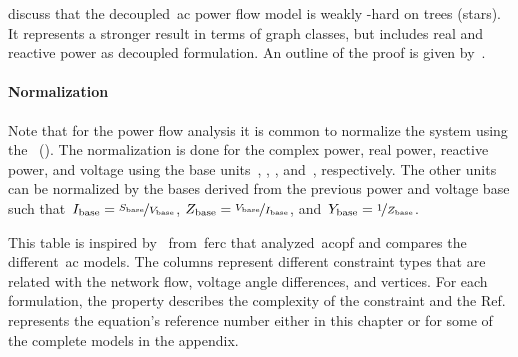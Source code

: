 \textcite{Leh16} discuss that the decoupled~\gls{ac} power flow model is weakly
\NP-hard on trees (stars). It represents a stronger result in terms of graph
classes, but includes real and reactive power as decoupled formulation. An
outline of the proof is given by~\textcite{Lav12}.
% 
\paragraph{Normalization}%
\label{ch:foundations:sec:power-flow-analyses:normalization}
% 
Note that for the power flow analysis it is common to normalize the system using
the~ (). The normalization is done for the complex power,
real power, reactive power, and voltage using the base units~\complexpowerbase,
\realpowerbase, \reactivepowerbase, and~\voltagebase, respectively. The other
units can be normalized by the bases derived from the previous power and voltage
base such that~$I_{\mathrm{base}} = \nicefrac{S_{\mathrm{base}}}{V_{\mathrm{base}}}$,
$Z_{\mathrm{base}} = \nicefrac{V_{\mathrm{base}}}{I_{\mathrm{base}}}$, and~$Y_{\mathrm{base}} =
\nicefrac{1}{Z_{\mathrm{base}}}$.
% 
\begin{landscape}
\begin{table}[t!]
    \centering
    
    \caption[Comparison of the different~\acrshort{ac} models.]{This table is
    inspired by~\textcite{Cai12} from~\gls{ferc} that analyzed~\gls{acopf} and
    compares the different~\gls{ac} models. The columns represent different
    constraint types that are related with the network flow, voltage angle
    differences, and vertices. For each formulation, the property describes the
    complexity of the constraint and the Ref. represents the equation's
    reference number either in this chapter or for some of the complete models
    in the appendix. }
    \label{tbl:ac-model-comparison}
\end{table}
\end{landscape}
% 
